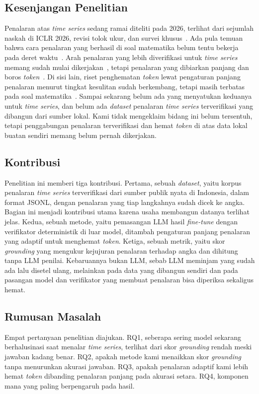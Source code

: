 \documentclass[10pt,a4paper,twocolumn]{article}
\begin{document}
\subsection{Kesenjangan Penelitian}
Penalaran atas \textit{time series} sedang ramai diteliti pada 2026, terlihat
dari sejumlah naskah di ICLR 2026, revisi tolok ukur, dan survei
khusus~\cite{mtbench2025,timeomni2026}. Ada pula temuan bahwa cara penalaran
yang berhasil di soal matematika belum tentu bekerja pada deret
waktu~\cite{merrill2024}. Arah penalaran yang lebih diverifikasi untuk
\textit{time series} memang sudah mulai dikerjakan~\cite{veritime2026}, tetapi
penalaran yang dibiarkan panjang dan boros \textit{token}~\cite{selfbudgeter2025}.
Di sisi lain, riset penghematan \textit{token} lewat pengaturan panjang
penalaran menurut tingkat kesulitan sudah berkembang, tetapi masih terbatas
pada soal matematika~\cite{selfbudgeter2025}. Sampai sekarang belum ada yang
menyatukan keduanya untuk \textit{time series}, dan belum ada \textit{dataset}
penalaran \textit{time series} terverifikasi yang dibangun dari sumber lokal.
Kami tidak mengeklaim bidang ini belum tersentuh, tetapi penggabungan penalaran
terverifikasi dan hemat \textit{token} di atas data lokal buatan sendiri memang
belum pernah dikerjakan.

\subsection{Kontribusi}
Penelitian ini memberi tiga kontribusi. Pertama, sebuah \textit{dataset}, yaitu
korpus penalaran \textit{time series} terverifikasi dari sumber publik nyata di
Indonesia, dalam format JSONL, dengan penalaran yang tiap langkahnya sudah dicek
ke angka. Bagian ini menjadi kontribusi utama karena usaha membangun datanya
terlihat jelas. Kedua, sebuah metode, yaitu pemasangan LLM hasil
\textit{fine-tune} dengan verifikator deterministik di luar model, ditambah
pengaturan panjang penalaran yang adaptif untuk menghemat \textit{token}.
Ketiga, sebuah metrik, yaitu skor \textit{grounding} yang mengukur kejujuran
penalaran terhadap angka dan dihitung tanpa LLM penilai. Kebaruannya bukan LLM,
sebab LLM meminjam yang sudah ada lalu disetel ulang, melainkan pada data yang
dibangun sendiri dan pada pasangan model dan verifikator yang membuat penalaran
bisa diperiksa sekaligus hemat.

\subsection{Rumusan Masalah}
Empat pertanyaan penelitian diajukan. RQ1, seberapa sering model sekarang
berhalusinasi saat menalar \textit{time series}, terlihat dari skor
\textit{grounding} rendah meski jawaban kadang benar. RQ2, apakah metode kami
menaikkan skor \textit{grounding} tanpa menurunkan akurasi jawaban. RQ3, apakah
penalaran adaptif kami lebih hemat \textit{token} dibanding penalaran panjang
pada akurasi setara. RQ4, komponen mana yang paling berpengaruh pada hasil.
\end{document}
